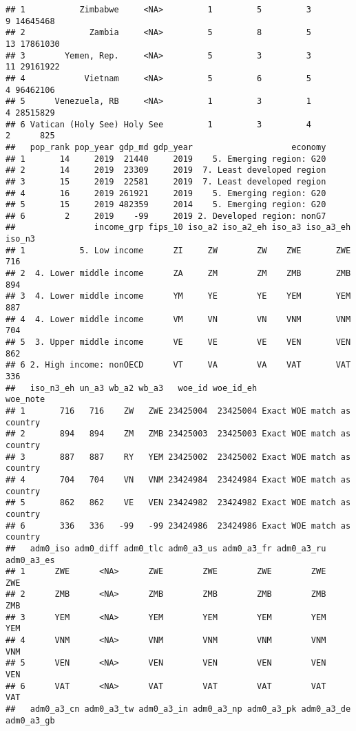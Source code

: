 \documentclass[
]{article}
\begin{document}
\begin{verbatim}
## 1           Zimbabwe     <NA>         1         5         3          9 14645468
## 2             Zambia     <NA>         5         8         5         13 17861030
## 3        Yemen, Rep.     <NA>         5         3         3         11 29161922
## 4            Vietnam     <NA>         5         6         5          4 96462106
## 5      Venezuela, RB     <NA>         1         3         1          4 28515829
## 6 Vatican (Holy See) Holy See         1         3         4          2      825
##   pop_rank pop_year gdp_md gdp_year                    economy
## 1       14     2019  21440     2019    5. Emerging region: G20
## 2       14     2019  23309     2019  7. Least developed region
## 3       15     2019  22581     2019  7. Least developed region
## 4       16     2019 261921     2019    5. Emerging region: G20
## 5       15     2019 482359     2014    5. Emerging region: G20
## 6        2     2019    -99     2019 2. Developed region: nonG7
##                income_grp fips_10 iso_a2 iso_a2_eh iso_a3 iso_a3_eh iso_n3
## 1           5. Low income      ZI     ZW        ZW    ZWE       ZWE    716
## 2  4. Lower middle income      ZA     ZM        ZM    ZMB       ZMB    894
## 3  4. Lower middle income      YM     YE        YE    YEM       YEM    887
## 4  4. Lower middle income      VM     VN        VN    VNM       VNM    704
## 5  3. Upper middle income      VE     VE        VE    VEN       VEN    862
## 6 2. High income: nonOECD      VT     VA        VA    VAT       VAT    336
##   iso_n3_eh un_a3 wb_a2 wb_a3   woe_id woe_id_eh                   woe_note
## 1       716   716    ZW   ZWE 23425004  23425004 Exact WOE match as country
## 2       894   894    ZM   ZMB 23425003  23425003 Exact WOE match as country
## 3       887   887    RY   YEM 23425002  23425002 Exact WOE match as country
## 4       704   704    VN   VNM 23424984  23424984 Exact WOE match as country
## 5       862   862    VE   VEN 23424982  23424982 Exact WOE match as country
## 6       336   336   -99   -99 23424986  23424986 Exact WOE match as country
##   adm0_iso adm0_diff adm0_tlc adm0_a3_us adm0_a3_fr adm0_a3_ru adm0_a3_es
## 1      ZWE      <NA>      ZWE        ZWE        ZWE        ZWE        ZWE
## 2      ZMB      <NA>      ZMB        ZMB        ZMB        ZMB        ZMB
## 3      YEM      <NA>      YEM        YEM        YEM        YEM        YEM
## 4      VNM      <NA>      VNM        VNM        VNM        VNM        VNM
## 5      VEN      <NA>      VEN        VEN        VEN        VEN        VEN
## 6      VAT      <NA>      VAT        VAT        VAT        VAT        VAT
##   adm0_a3_cn adm0_a3_tw adm0_a3_in adm0_a3_np adm0_a3_pk adm0_a3_de adm0_a3_gb

\end{verbatim}
\end{document}
